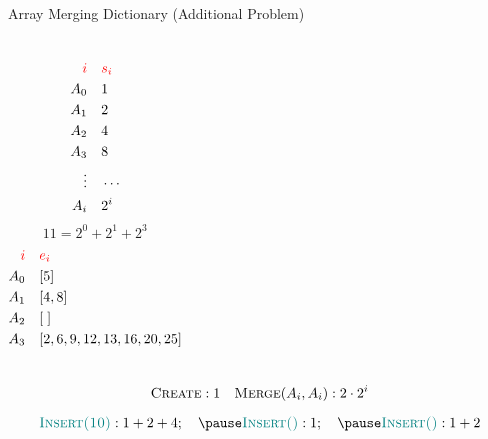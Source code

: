 
\begin{frame}{}
  \begin{exampleblock}{Array Merging Dictionary (Additional Problem)}
    \begin{columns}
        \pause
	\begin{align*}
	  \textcolor{red}{i} & \quad \textcolor{red}{s_i} \\
	  A_{0} & \quad 1 \\
	  A_{1} & \quad 2 \\
	  A_{2} & \quad 4 \\
	  A_{3} & \quad 8 \\
	  \vdots & \quad \cdots \\
	  A_{i} & \quad 2^{i}
	\end{align*}
        \pause
        \[
	  11 = 2^{0} + 2^{1} + 2^{3} 
	\]
	\begin{align*}
	  \textcolor{red}{i} & \quad \textcolor{red}{e_i} \\
	  A_{0} & \quad [5] \\
	  A_{1} & \quad [4,8] \\
	  A_{2} & \quad [\;] \\
	  A_{3} & \quad [2, 6, 9, 12, 13, 16, 20, 25]
	\end{align*}
  \end{columns}
    
  \pause
  \vspace{0.30cm}
  \[
    \textsc{Create}: 1 \quad \textsc{Merge$(A_i, A_i)$}: 2 \cdot 2^i
  \]
  \end{exampleblock}

  \pause
  \[
    \textsc{\teal{Insert(10)}}: 1 + 2 + 4; \quad \pause \textsc{\teal{Insert()}}: 1; \quad \pause \textsc{\teal{Insert()}}: 1 + 2
  \]
\end{frame}

